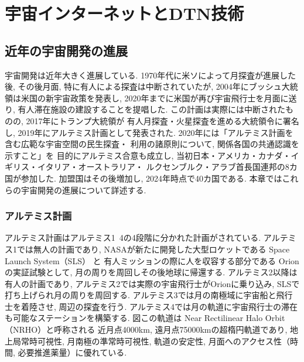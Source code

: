 \chapter{宇宙インターネットとDTN技術}
\label{chap:prerequisite_knowledge}

\section{近年の宇宙開発の進展}
宇宙開発は近年大きく進展している. 1970年代に米ソによって月探査が進展した後, 
その後月面, 特に有人による探査は中断されていたが, 
2004年にブッシュ大統領は米国の新宇宙政策を発表し, 
2020年までに米国が再び宇宙飛行士を月面に送り, 
有人滞在施設の建設することを提唱した\cite{久保田2009}.
この計画は実際には中断されたものの, 2017年にトランプ大統領が
有人月探査・火星探査を進める大統領令に署名し, 
2019年にアルテミス計画として発表された\cite{nasa2020}.
2020年には「アルテミス計画を含む広範な宇宙空間の民生探査・
利用の諸原則について, 関係各国の共通認識を示すこと」を
目的にアルテミス合意\cite{artemis_agreement1}も成立し, 
当初日本・アメリカ・カナダ・イギリス・イタリア・オーストラリア・
ルクセンブルク・アラブ首長国連邦の8カ国が参加した\cite{artemis_agreement2}. 
加盟国はその後増加し, 2024年時点で40カ国である\cite{artemis_agreement3}. 
本章ではこれらの宇宙開発の進展について詳述する. 

\subsection{アルテミス計画}
\label{section:月・火星の探査計画}
アルテミス計画はアルテミス1~4の4段階に分かれた計画がされている. 
アルテミス1では無人の計画であり, NASAが新たに開発した大型ロケットである
Space Launch System（SLS） と 有人ミッションの際に人を収容する部分である
Orionの実証試験として, 月の周りを周回しその後地球に帰還する. アルテミス2以降は有人の計画であり, 
アルテミス2では実際の宇宙飛行士がOrionに乗り込み, SLSで打ち上げられ月の周りを周回する. 
アルテミス3では月の南極域に宇宙船と飛行士を着陸させ, 周辺の探査を行う. 
アルテミス4では月の軌道に宇宙飛行士の滞在も可能なステーションを構築する. 
図この軌道は Near Rectilinear Halo Orbit （NRHO）と呼称される
近⽉点4000km, 遠⽉点75000kmの超楕円軌道であり, 
地上局常時可視性, 月南極の準常時可視性, 軌道の安定性, 
月面へのアクセス性（時間, 必要推進薬量）に優れている\cite{kiban_dai48}. 

